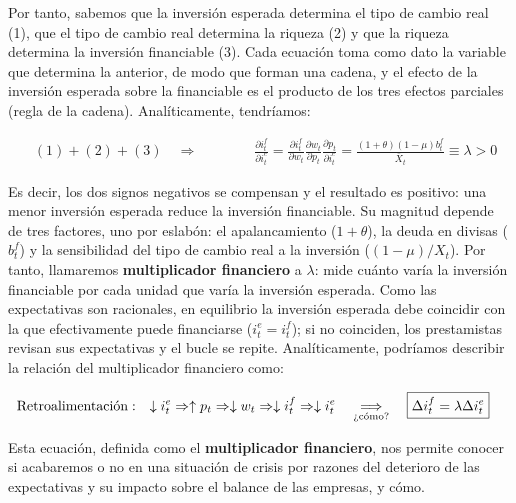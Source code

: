 \documentclass[10pt,a4paper]{article}
\begin{document}
Por tanto, sabemos que la inversión esperada determina el tipo de cambio real (1), que el tipo de cambio real determina la riqueza (2) y que la riqueza determina la inversión financiable (3). Cada ecuación toma como dato la variable que determina la anterior, de modo que forman una cadena, y el efecto de la inversión esperada sobre la financiable es el producto de los tres efectos parciales (regla de la cadena). Analíticamente, tendríamos:

$$\begin{aligned}
  &(1)+(2)+(3)\quad \Longrightarrow\hspace{4em}\frac{\partial i_t^f}{\partial i_t^e}=\frac{\partial i_t^f}{\partial w_t}\frac{\partial w_t}{\partial p_t}\frac{\partial p_t}{\partial i_t^e}=\boxed{\frac{(1+\theta)(1-\mu)b_t^f}{\bar X_t}\equiv\lambda>0}
\end{aligned}$$

Es decir, los dos signos negativos se compensan y el resultado es positivo: una menor inversión esperada reduce la inversión financiable. Su magnitud depende de tres factores, uno por eslabón: el apalancamiento ($1+\theta$), la deuda en divisas ($b^f_t$) y la sensibilidad del tipo de cambio real a la inversión ($(1-\mu)/X_t$). Por tanto, llamaremos \textbf{multiplicador financiero} a $\lambda$: mide cuánto varía la inversión financiable por cada unidad que varía la inversión esperada. Como las expectativas son racionales, en equilibrio la inversión esperada debe coincidir con la que efectivamente puede financiarse ($i_t^e=i_t^f$); si no coinciden, los prestamistas revisan sus expectativas y el bucle se repite. Analíticamente, podríamos describir la relación del multiplicador financiero como:

$$\begin{aligned}
  &\text{Retroalimentación}: \quad \downarrow i_t^e \Rightarrow \uparrow p_t \Rightarrow \downarrow w_t \Rightarrow \downarrow i_t^f \Rightarrow \downarrow i_t^e\quad \underset{\text{\scriptsize ¿cómo?}}{\Longrightarrow}\quad \boxed{\Delta i_t^f=\lambda\Delta i_t^e}
\end{aligned}$$

Esta ecuación, definida como el \textbf{multiplicador financiero}, nos permite conocer si acabaremos o no en una situación de crisis por razones del deterioro de las expectativas y su impacto sobre el balance de las empresas, y cómo.
\end{document}
